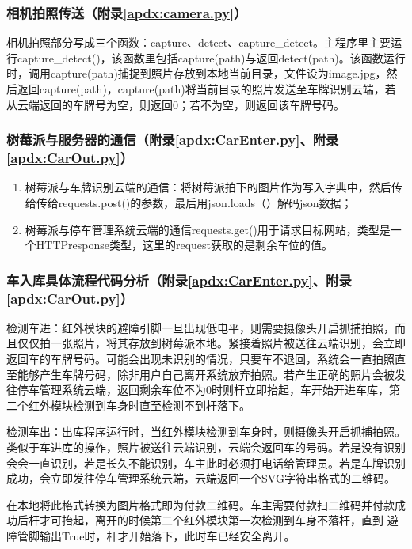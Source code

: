 \subsubsection{相机拍照传送（附录\ref{apdx:camera.py}）}
相机拍照部分写成三个函数：capture、detect、capture\_detect。主程序里主要运行capture\_detect()，该函数里包括capture(path)与返回detect(path)。该函数运行时，调用capture(path)捕捉到照片存放到本地当前目录，文件设为image.jpg，然后返回capture(path)，capture(path)将当前目录的照片发送至车牌识别云端，若从云端返回的车牌号为空，则返回0；若不为空，则返回该车牌号码。

\subsubsection{树莓派与服务器的通信（附录\ref{apdx:CarEnter.py}、附录\ref{apdx:CarOut.py}）}
\begin{enumerate}
    \item 树莓派与车牌识别云端的通信：将树莓派拍下的图片作为写入字典中，然后传给传给requests.post()的参数，最后用json.loads（）解码json数据；
    \item 树莓派与停车管理系统云端的通信requests.get()用于请求目标网站，类型是一个HTTPresponse类型，这里的request获取的是剩余车位的值。
\end{enumerate}

\subsubsection{车入库具体流程代码分析（附录\ref{apdx:CarEnter.py}、附录\ref{apdx:CarOut.py}）}
检测车进：红外模块的避障引脚一旦出现低电平，则需要摄像头开启抓捕拍照，而且仅仅拍一张照片，将其存放到树莓派本地。紧接着照片被送往云端识别，会立即返回车的车牌号码。可能会出现未识别的情况，只要车不退回，系统会一直拍照直至能够产生车牌号码，除非用户自己离开系统放弃拍照。若产生正确的照片会被发往停车管理系统云端，返回剩余车位不为0时则杆立即抬起，车开始开进车库，第二个红外模块检测到车身时直至检测不到杆落下。

检测车出：出库程序运行时，当红外模块检测到车身时，则摄像头开启抓捕拍照。类似于车进库的操作，照片被送往云端识别，云端会返回车的号码。若是没有识别会会一直识别，若是长久不能识别，车主此时必须打电话给管理员。若是车牌识别成功，会立即发往停车管理系统云端，云端返回一个SVG字符串格式的二维码。

在本地将此格式转换为图片格式即为付款二维码。车主需要付款扫二维码并付款成功后杆才可抬起，离开的时候第二个红外模块第一次检测到车身不落杆，直到
避障管脚输出True时，杆才开始落下，此时车已经安全离开。
